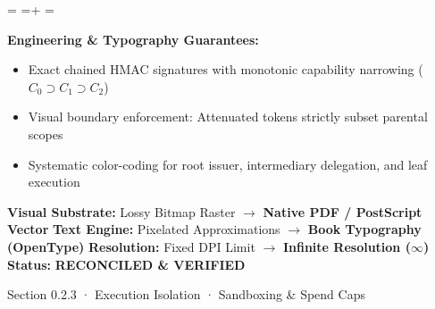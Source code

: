 \documentclass[10pt,a4paper,landscape]{article}
\newcommand{\pdautoscale}[2]{%
  \pdmaxh=#1\relax
  \pdmaxw=#2\relax
  \sbox{\pdscaledbox}{\usebox{\pdfigbox}}%
  \pdcurh=\dimexpr\ht\pdscaledbox+\dp\pdscaledbox\relax
  \pdcurw=\wd\pdscaledbox
  \ifdim\dimexpr\pdcurw * 100 / \pdmaxw\relax > \dimexpr\pdcurh * 100 / \pdmaxh\relax
    \resizebox{\pdmaxw}{!}{\usebox{\pdscaledbox}}%
  \else
    \resizebox{!}{\pdmaxh}{\usebox{\pdscaledbox}}%
  \fi
}
\begin{document}
\begin{minipage}[t]{0.492\linewidth}
  \begin{tcolorbox}[
    colback=pdcobalt!3,colframe=pdcobalt!85!black,arc=1.5pt,
    boxrule=0.7pt,top=1.5pt,bottom=1.5pt,left=4pt,right=4pt,
    title={\pdgrotesk\footnotesize\bfseries \color{white} B. Authoritative Native Vector Replacement \hfill \texttt{.tex / TikZ / PGF}}
  ]
    \begin{minipage}[c][8.3cm][c]{\linewidth}
      \centering
      \sbox{\pdfigbox}{}
      \pdautoscale{8.0cm}{\linewidth}
    \end{minipage}
    \tcblower
    \begin{minipage}[t][2.0cm][t]{\linewidth}
      \pdgrotesk\scriptsize
      \textbf{{\color{pdcobalt} Engineering \& Typography Guarantees:}}\\
      \begin{itemize}[leftmargin=9pt,itemsep=0pt,topsep=0.5pt,parsep=0pt]
        \item Exact chained HMAC signatures with monotonic capability narrowing ($C_0 \supset C_1 \supset C_2$)
        \item Visual boundary enforcement: Attenuated tokens strictly subset parental scopes
        \item Systematic color-coding for root issuer, intermediary delegation, and leaf execution
      \end{itemize}
    \end{minipage}
  \end{tcolorbox}
\end{minipage}

\vspace*{0.05cm}
\noindent
\begin{tcolorbox}[
  colback=hhpaper,colframe=hhgray!35,arc=1.5pt,boxrule=0.4pt,
  top=1.5pt,bottom=1.5pt,left=6pt,right=6pt
]
  \pdgrotesk\scriptsize
  \noindent
  \textbf{Visual Substrate:} Lossy Bitmap Raster $\rightarrow$ \textbf{\color{pdcobalt}Native PDF / PostScript Vector}\hfill
  \textbf{Text Engine:} Pixelated Approximations $\rightarrow$ \textbf{\color{pdcobalt}Book Typography (OpenType)}\hfill
  \textbf{Resolution:} Fixed DPI Limit $\rightarrow$ \textbf{\color{pdcobalt}Infinite Resolution ($\infty$)}\hfill
  \textbf{Status:} \textbf{\color{pdteal}RECONCILED \& VERIFIED}
\end{tcolorbox}
\clearpage

\noindent
\begin{minipage}[t]{\linewidth}
  \hfill
  {\pdgrotesk\footnotesize\color{hhgray} Section 0.2.3 · Execution Isolation · Sandboxing \& Spend Caps}\\
  \vspace*{0.03cm}
  \noindent{\color{hhgray!40}\rule{\linewidth}{0.5pt}}
\end{minipage}
\end{document}
